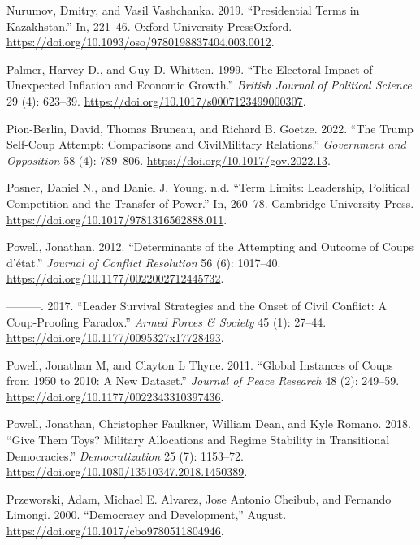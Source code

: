 \documentclass[
  12pt,
]{report}
\newlength{\cslhangindent}
\newenvironment{CSLReferences}[2] %
 {\begin{list}{}{%
  \setlength{\itemindent}{0pt}
  \setlength{\leftmargin}{0pt}
  \setlength{\parsep}{0pt}
  \ifodd #1
   \setlength{\leftmargin}{\cslhangindent}
   \setlength{\itemindent}{-1\cslhangindent}
  \fi
  \setlength{\itemsep}{#2\baselineskip}}}
 {\end{list}}
\begin{document}
\begin{CSLReferences}{1}{0}
Nurumov, Dmitry, and Vasil Vashchanka. 2019. {``Presidential Terms in
Kazakhstan.''} In, 221--46. Oxford University PressOxford.
\url{https://doi.org/10.1093/oso/9780198837404.003.0012}.

Palmer, Harvey D., and Guy D. Whitten. 1999. {``The Electoral Impact of
Unexpected Inflation and Economic Growth.''} \emph{British Journal of
Political Science} 29 (4): 623--39.
\url{https://doi.org/10.1017/s0007123499000307}.

Pion-Berlin, David, Thomas Bruneau, and Richard B. Goetze. 2022. {``The
Trump Self-Coup Attempt: Comparisons and Civil{\textendash}Military
Relations.''} \emph{Government and Opposition} 58 (4): 789--806.
\url{https://doi.org/10.1017/gov.2022.13}.

Posner, Daniel N., and Daniel J. Young. n.d. {``Term Limits: Leadership,
Political Competition and the Transfer of Power.''} In, 260--78.
Cambridge University Press.
\url{https://doi.org/10.1017/9781316562888.011}.

Powell, Jonathan. 2012. {``Determinants of the Attempting and Outcome of
Coups d{'}état.''} \emph{Journal of Conflict Resolution} 56 (6):
1017--40. \url{https://doi.org/10.1177/0022002712445732}.

---------. 2017. {``Leader Survival Strategies and the Onset of Civil
Conflict: A Coup-Proofing Paradox.''} \emph{Armed Forces \& Society} 45
(1): 27--44. \url{https://doi.org/10.1177/0095327x17728493}.

Powell, Jonathan M, and Clayton L Thyne. 2011. {``Global Instances of
Coups from 1950 to 2010: A New Dataset.''} \emph{Journal of Peace
Research} 48 (2): 249--59.
\url{https://doi.org/10.1177/0022343310397436}.

Powell, Jonathan, Christopher Faulkner, William Dean, and Kyle Romano.
2018. {``Give Them Toys? Military Allocations and Regime Stability in
Transitional Democracies.''} \emph{Democratization} 25 (7): 1153--72.
\url{https://doi.org/10.1080/13510347.2018.1450389}.

Przeworski, Adam, Michael E. Alvarez, Jose Antonio Cheibub, and Fernando
Limongi. 2000. {``Democracy and Development,''} August.
\url{https://doi.org/10.1017/cbo9780511804946}.


\end{CSLReferences}
\end{document}
